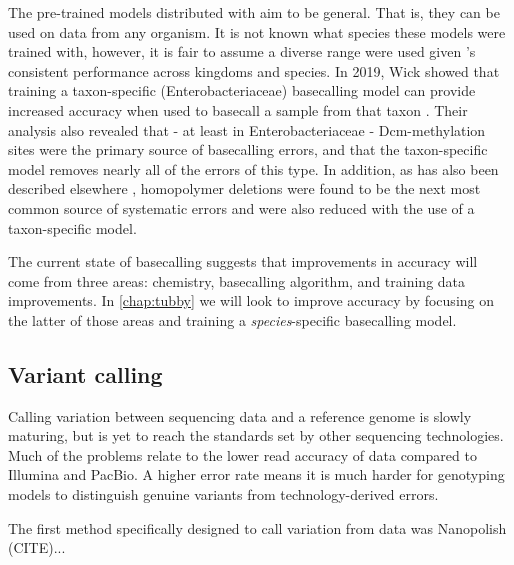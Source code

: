 \noindent
The pre-trained models distributed with \guppy{} aim to be general. That is, they can be used on \ont{} data from any organism. It is not known what species these models were trained with, however, it is fair to assume a diverse range were used given \guppy{}'s consistent performance across kingdoms and species. In 2019, Wick \etal{} showed that training a taxon-specific (Enterobacteriaceae) basecalling model can provide increased accuracy when used to basecall a sample from that taxon \cite{wick2019}. Their analysis also revealed that - at least in Enterobacteriaceae - Dcm-methylation sites were the primary source of \guppy{} basecalling errors, and that the taxon-specific model removes nearly all of the errors of this type. In addition, as has also been described elsewhere \cite{watson2019}, homopolymer deletions were found to be the next most common source of systematic errors and were also reduced with the use of a taxon-specific model.

The current state of \ont{} basecalling suggests that improvements in accuracy will come from three areas: chemistry, basecalling algorithm, and training data improvements. In \autoref{chap:tubby} we will look to improve \ont{} accuracy by focusing on the latter of those areas and training a \emph{species}-specific basecalling model.

\subsection{Variant calling}
\label{sec:ont-var-calling-intro}
Calling variation between \ont{} sequencing data and a reference genome is slowly maturing, but is yet to reach the standards set by other sequencing technologies. Much of the problems relate to the lower read accuracy of \ont{} data compared to Illumina and PacBio. A higher error rate means it is much harder for genotyping models to distinguish genuine variants from technology-derived errors.

The first method specifically designed to call variation from \ont{} data was Nanopolish (CITE)...





